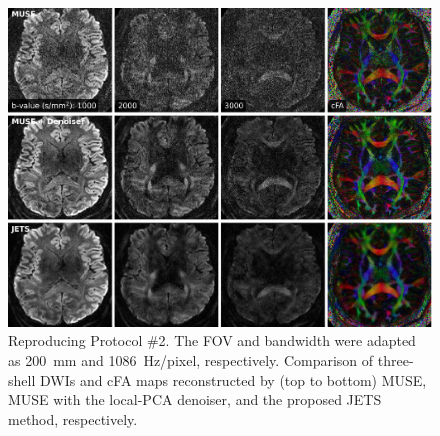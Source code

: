 \documentclass[a4paper,11pt,twoside]{report}
\begin{document}
    \begin{figure}[h]
        \includegraphics[width=\textwidth]{../figures/supp_fig6.png}
        \caption{Reproducing Protocol \#2.
        The FOV and bandwidth were adapted as
        \SI{200}{mm} and 1086~Hz/pixel, respectively.
        Comparison of three-shell DWIs and cFA maps
        reconstructed by (top to bottom)
        MUSE, MUSE with the local-PCA denoiser,
        and the proposed JETS method, respectively.}
    \end{figure}
\end{document}
